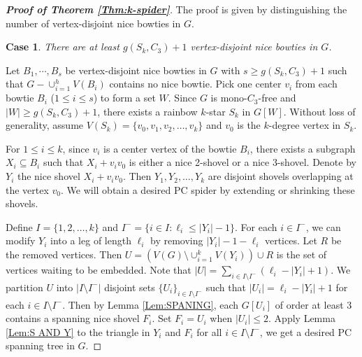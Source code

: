 \documentclass[10pt,a4paper]{amsart}
\newtheorem{case}{Case}
\begin{document}
\begin{proof}[\textbf{Proof of Theorem \ref{Thm:k-spider}}]
The proof is given by distinguishing the number of vertex-disjoint nice bowties in $G$.
\begin{case}
    There are at least $g(S_k,C_3)+1$ vertex-disjoint nice bowties in $G$.
\end{case}
Let $B_1,\cdots,B_s$ be vertex-disjoint nice bowties in $G$ with $s\geq g(S_k,C_3)+1$ such that $G-\cup^h_{i=1} {V(B_i)}$  contains no nice bowtie.   Pick one center $v_i$ from each bowtie $B_i$ ($1\leq i\leq s$) to form a set  $W$.  Since $G$ is mono-$C_3$-free and $|W|\geq g(S_k,C_3)+1$, there exists a rainbow $k$-star $S_k$ in $G[W]$. Without loss of generality, assume $V(S_k)=\{v_0, v_1,v_2, \ldots, v_k\}$ and $v_0$ is the $k$-degree vertex in $S_k$.

For $1\leq i\leq k$, since $v_i$ is a center vertex of the bowtie $B_i$, there exists a subgraph $X_i\subseteq B_i$ such that $X_i+v_iv_0$ is either a nice 2-shovel or a nice 3-shovel. Denote by $Y_i$  the nice shovel $X_i+v_iv_0$. Then $Y_1,Y_2,\ldots,Y_k$ are disjoint shovels overlapping at the vertex $v_0$. We will obtain a desired PC spider by extending or shrinking these shovels.

Define $I=\{1,2,\ldots,k\}$ and $I^-=\{i\in I:  \ell_i \leq |Y_i|-1\}$.
For each $i\in I^-$,  we can modify $Y_i$ into a leg of length $\ell_i$ by removing  $|Y_i|-1-\ell_i $ vertices.  Let $R$  be the removed vertices. Then $U=(V(G)\setminus \cup^k_{i=1} V(Y_i))\cup R$ is the set of vertices waiting to be embedded. Note that $|U|=\sum_{i\in I\setminus I^-} {(\ell_i-|Y_i|+1)}$. We partition $U$ into $|I\setminus I^-|$ disjoint sets $\{U_i\}_{i\in I\setminus I^-}$  such that $|U_i|=\ell_i-|Y_i|+1$ for each $i\in I\setminus I^-$.
Then by Lemma \ref{Lem:SPANING}, each $G[U_i]$ of order at least $3$ contains a spanning nice shovel $F_i$. Set $F_i=U_i$ when $|U_i|\leq 2$. Apply Lemma \ref{Lem:S AND Y} to the triangle in $Y_i$ and $F_i$ for all $i\in I\setminus I^-$, we get a desired PC spanning tree in $G$.


\end{proof}
\end{document}
